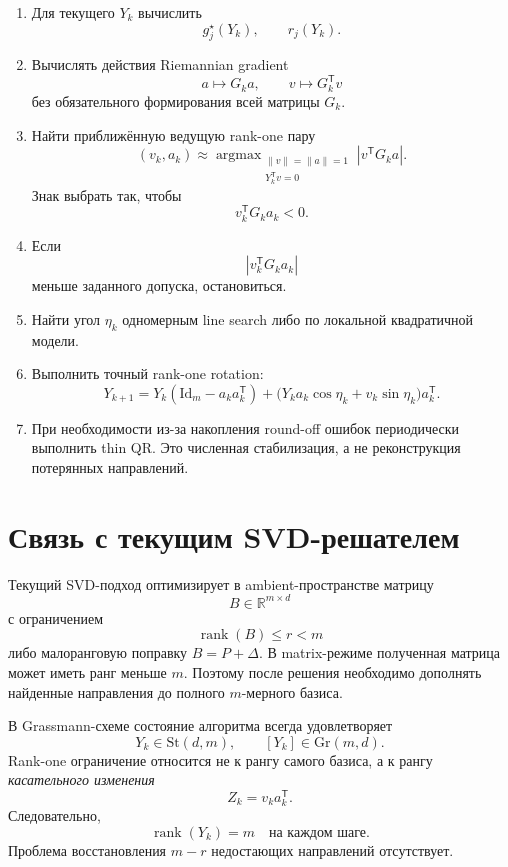 \documentclass[11pt,a4paper]{article}
\newcommand{\R}{\mathbb R}
\newcommand{\T}{^{\mathsf T}}
\newcommand{\Id}{\mathrm{Id}}
\newcommand{\Gr}{\mathrm{Gr}}
\newcommand{\St}{\mathrm{St}}
\DeclareMathOperator{\rank}{rank}
\DeclareMathOperator{\argmax}{argmax}
\begin{document}
\begin{enumerate}[label=\arabic*.]
    \item Для текущего \(Y_k\) вычислить
    \[
        g_j^\star(Y_k),
        \qquad
        r_j(Y_k).
    \]

    \item Вычислять действия Riemannian gradient
    \[
        a\mapsto G_ka,
        \qquad
        v\mapsto G_k\T v
    \]
    без обязательного формирования всей матрицы \(G_k\).

    \item Найти приближённую ведущую rank-one пару
    \[
        (v_k,a_k)
        \approx
        \argmax_{\substack{
            \|v\|=\|a\|=1\\
            Y_k\T v=0
        }}
        |v\T G_ka|.
    \]
    Знак выбрать так, чтобы
    \[
        v_k\T G_ka_k<0.
    \]

    \item Если
    \[
        |v_k\T G_ka_k|
    \]
    меньше заданного допуска, остановиться.

    \item Найти угол \(\eta_k\) одномерным line search либо по
    локальной квадратичной модели.

    \item Выполнить точный rank-one rotation:
    \[
        \boxed{
        Y_{k+1}
        =
        Y_k(\Id_m-a_ka_k\T)
        +
        \bigl(
            Y_ka_k\cos\eta_k
            +
            v_k\sin\eta_k
        \bigr)a_k\T.
        }
    \]

    \item При необходимости из-за накопления round-off ошибок
    периодически выполнить thin QR. Это численная стабилизация,
    а не реконструкция потерянных направлений.
\end{enumerate}

\section{Связь с текущим SVD-решателем}

Текущий SVD-подход оптимизирует в ambient-пространстве матрицу
\[
    B\in\R^{m\times d}
\]
с ограничением
\[
    \rank(B)\le r<m
\]
либо малоранговую поправку \(B=P+\Delta\). В matrix-режиме
полученная матрица может иметь ранг меньше \(m\). Поэтому после
решения необходимо дополнять найденные направления до полного
\(m\)-мерного базиса.

В Grassmann-схеме состояние алгоритма всегда удовлетворяет
\[
    Y_k\in\St(d,m),
    \qquad
    [Y_k]\in\Gr(m,d).
\]
Rank-one ограничение относится не к рангу самого базиса, а к рангу
\emph{касательного изменения}
\[
    Z_k=v_ka_k\T.
\]
Следовательно,
\[
    \boxed{
    \rank(Y_k)=m
    \quad\text{на каждом шаге}.
    }
\]
Проблема восстановления \(m-r\) недостающих направлений отсутствует.
\end{document}
